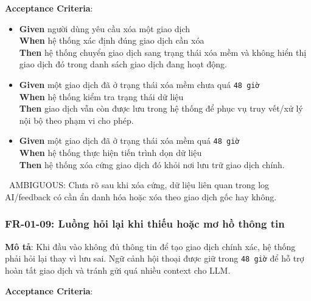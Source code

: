 \textbf{Acceptance Criteria}:

\begin{itemize}
\item \textbf{Given} người dùng yêu cầu xóa một giao dịch  \\ \hspace*{1.5em}  \textbf{When} hệ thống xác định đúng giao dịch cần xóa  \\ \hspace*{1.5em}  \textbf{Then} hệ thống chuyển giao dịch sang trạng thái xóa mềm và không hiển thị giao dịch đó trong danh sách giao dịch đang hoạt động.
\item \textbf{Given} một giao dịch đã ở trạng thái xóa mềm chưa quá \texttt{48 giờ}  \\ \hspace*{1.5em}  \textbf{When} hệ thống kiểm tra trạng thái dữ liệu  \\ \hspace*{1.5em}  \textbf{Then} giao dịch vẫn còn được lưu trong hệ thống để phục vụ truy vết/xử lý nội bộ theo phạm vi cho phép.
\item \textbf{Given} một giao dịch đã ở trạng thái xóa mềm quá \texttt{48 giờ}  \\ \hspace*{1.5em}  \textbf{When} hệ thống thực hiện tiến trình dọn dữ liệu  \\ \hspace*{1.5em}  \textbf{Then} hệ thống xóa cứng giao dịch đó khỏi nơi lưu trữ giao dịch chính.
\end{itemize}
\warningicon\  AMBIGUOUS: Chưa rõ sau khi xóa cứng, dữ liệu liên quan trong log AI/feedback có cần ẩn danh hóa hoặc xóa theo giao dịch gốc hay không.



\subsubsection{FR-01-09: Luồng hỏi lại khi thiếu hoặc mơ hồ thông tin}

\textbf{Mô tả}: Khi đầu vào không đủ thông tin để tạo giao dịch chính xác, hệ thống phải hỏi lại thay vì lưu sai. Ngữ cảnh hội thoại được giữ trong \texttt{48 giờ} để hỗ trợ hoàn tất giao dịch và tránh gửi quá nhiều context cho LLM.



\textbf{Acceptance Criteria}:

